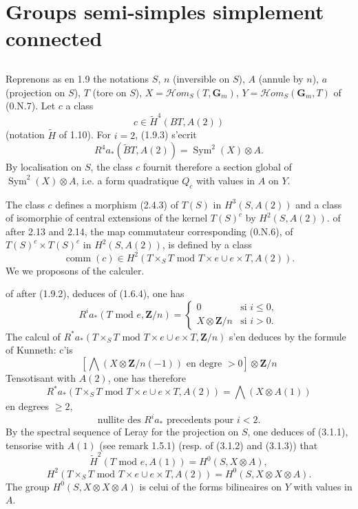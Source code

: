 \documentclass[11pt,a4paper]{article}
\theoremstyle{plain}
\theoremstyle{definition}
\DeclareMathOperator{\Sym}{Sym}
\DeclareMathOperator{\comm}{comm}
\begin{document}
\section{Groups semi-simples simplement connected}

\subsection{}\label{3.1}

Reprenons as en 1.9 the notations $S$, $n$ (inversible on $S$), $A$ (annule by $n$), $a$ (projection on $S$), $T$ (tore on $S$), $X = \mathscr{H}om_S(T, \mathbf{G}_m)$, $Y = \mathscr{H}om_S(\mathbf{G}_m, T)$ of (0.N.7). Let $c$ a class
\[
c \in \widetilde{H}^4(BT, A(2))
\]
(notation $\widetilde{H}$ of 1.10). For $i = 2$, (1.9.3) s'ecrit
\[
R^4 a_*(\widetilde{B}T, A(2)) = \Sym^2(X) \otimes A.
\]
By localisation on $S$, the class $c$ fournit therefore a section global of $\Sym^2(X) \otimes A$, i.e. a form quadratique $Q_c$ with values in $A$ on $Y$.

The class $c$ defines a morphism (2.4.3) of $T(S)$ in $H^3(S, A(2))$ and a class of isomorphie of central extensions of the kernel $T(S)^c$ by $H^2(S, A(2))$. of after 2.13 and 2.14, the map commutateur corresponding (0.N.6), of $T(S)^c \times T(S)^c$ in $H^2(S, A(2))$, is defined by a class
\[
\comm(c) \in H^2(T \times_S T \text{ mod } T \times e \cup e \times T, A(2)).
\]
We we proposons of the calculer.

of after (1.9.2), deduces of (1.6.4), one has
\begin{equation}\label{3.1.1}
R^i a_*(T \text{ mod } e, \mathbf{Z}/n) =
\begin{cases}
0 & \text{si } i \leq 0, \\
X \otimes \mathbf{Z}/n & \text{si } i > 0.
\end{cases}
\end{equation}
The calcul of $R^* a_*(T \times_S T \text{ mod } T \times e \cup e \times T, \mathbf{Z}/n)$ s'en deduces by the formule of Kunneth: c'is
\[
[\bigwedge(X \otimes \mathbf{Z}/n(-1)) \text{ en degre } > 0] \otimes \mathbf{Z}/n
\]
Tensotisant with $A(2)$, one has therefore
\begin{equation}\label{3.1.2}
R^* a_*(T \times_S T \text{ mod } T \times e \cup e \times T, A(2)) = \bigwedge(X \otimes A(1))
\end{equation}
en degrees $\geq 2$,
\begin{equation}\label{3.1.3}
\text{nullite des } R^i a_* \text{ precedents pour } i < 2.
\end{equation}
By the spectral sequence of Leray for the projection on $S$, one deduces of (3.1.1), tensorise with $A(1)$ (see remark 1.5.1) (resp. of (3.1.2) and (3.1.3)) that
\begin{equation}\label{3.1.4}
\widetilde{H}^2(T \text{ mod } e, A(1)) = H^0(S, X \otimes A),
\end{equation}
\begin{equation}\label{3.1.5}
H^2(T \times_S T \text{ mod } T \times e \cup e \times T, A(2)) = H^0(S, X \otimes X \otimes A).
\end{equation}
The group $H^0(S, X \otimes X \otimes A)$ is celui of the forms bilineaires on $Y$ with values in $A$.
\end{document}
